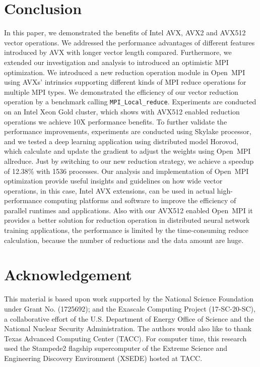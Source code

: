 \documentclass[sigconf]{acmart}
\newcommand{\mpifunc}[1]{\lstinline"MPI_#1"\xspace}
\newcommand{\ompi}[0]{Open~MPI\xspace}
\newcommand{\mpi}[0]{\textsc{MPI}\xspace}
\begin{document}
\section{Conclusion}\label{sec:conclusion}
In this paper, we demonstrated the benefits of Intel AVX, AVX2 and AVX512 vector operations. We
addressed the performance advantages of different features introduced by AVX
with longer vector length compared. Furthermore,
we extended our investigation and analysis to introduced
an optimistic \mpi optimization.
%
We introduced
a new reduction operation module in \ompi using AVXs' intrinsics supporting
different kinds of \mpi reduce operations for multiple \mpi types. We
demonstrated the efficiency of our vector reduction operation by a benchmark
calling \mpifunc{Local_reduce}. Experiments are conducted on an Intel Xeon Gold cluster,
which shows with AVX512 enabled reduction operations we achieve 10X performance benefits.
To further validate the performance improvements,
experiments are conducted using Skylake processor, and we tested a deep learning
application using distributed model Horovod, which calculate and update the gradient to adjust the weights using \ompi allreduce.
Just by switching to our new reduction strategy, we achieve a speedup of 12.38\% with 1536 processes.
Our analysis and implementation of \ompi optimization provide useful insights and
guidelines on how wide vector operations, in this case, Intel AVX extensions, can be
used in actual high-performance computing platforms and
software to improve the efficiency of parallel runtimes and applications.
Also with our AVX512 enabled \ompi it provides a better solution for reduction operation
in distributed neural network
training applications, the performance is limited by the time-consuming reduce calculation,
because the number of reductions and the data amount are huge.

\section*{Acknowledgement}
%
This material is based upon work supported by the National Science Foundation under Grant No. (1725692); and the Exascale Computing Project (17-SC-20-SC), a collaborative effort of the
U.S. Department of Energy Office of Science and the National Nuclear Security Administration.
The authors would also like to thank
Texas Advanced Computing Center (TACC). For computer time, this research used
the Stampede2 flagship supercomputer of the Extreme Science and Engineering Discovery Environment (XSEDE) hosted at TACC.
%
%


\end{document}
